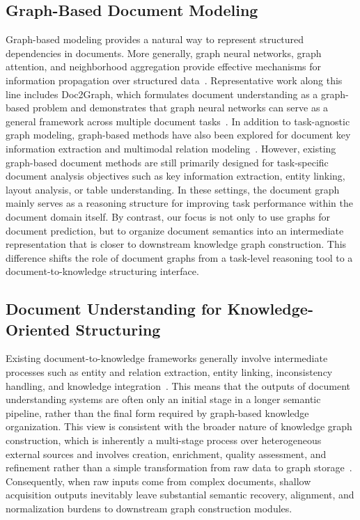 \documentclass[pdflatex,twocolumn,iicol,sn-vancouver-num]{sn-jnl}%
\theoremstyle{thmstyleone}%
\theoremstyle{thmstyletwo}%
\theoremstyle{thmstylethree}%
\begin{document}
\subsection{Graph-Based Document Modeling}
Graph-based modeling provides a natural way to represent structured dependencies in documents. More generally, graph neural networks, graph attention, and neighborhood aggregation provide effective mechanisms for information propagation over structured data~\cite{kipfSemiSupervisedClassificationGraph2017,velickovicGraphAttentionNetworks2018,hamiltonInductiveRepresentationLearning2018}.
Representative work along this line includes Doc2Graph, which formulates document understanding as a graph-based problem and demonstrates that graph neural networks can serve as a general framework across multiple document tasks~\cite{gemelliDoc2GraphTaskAgnostic2023}. In addition to task-agnostic graph modeling, graph-based methods have also been explored for document key information extraction and multimodal relation modeling~\cite{yuPICKProcessingKey2020,zhangExploringMultimodalRelation}. However, existing graph-based document methods are still primarily designed for task-specific document analysis objectives such as key information extraction, entity linking, layout analysis, or table understanding. In these settings, the document graph mainly serves as a reasoning structure for improving task performance within the document domain itself. By contrast, our focus is not only to use graphs for document prediction, but to organize document semantics into an intermediate representation that is closer to downstream knowledge graph construction. This difference shifts the role of document graphs from a task-level reasoning tool to a document-to-knowledge structuring interface.

\subsection{Document Understanding for Knowledge-Oriented Structuring}

Existing document-to-knowledge frameworks generally involve intermediate processes such as entity and relation extraction, entity linking, inconsistency handling, and knowledge integration~\cite{salmanDocKGUnstructuredDocuments2024,sunDocs2KGUnifiedKnowledge2024,galianoT2KGTransformingMultimodal2023a}. This means that the outputs of document understanding systems are often only an initial stage in a longer semantic pipeline, rather than the final form required by graph-based knowledge organization. This view is consistent with the broader nature of knowledge graph construction, which is inherently a multi-stage process over heterogeneous external sources and involves creation, enrichment, quality assessment, and refinement rather than a simple transformation from raw data to graph storage~\cite{zhongComprehensiveSurveyAutomatic2023,hoganKnowledgeGraphs2022a,paulheimAutomaticKnowledgeGraph}. Consequently, when raw inputs come from complex documents, shallow acquisition outputs inevitably leave substantial semantic recovery, alignment, and normalization burdens to downstream graph construction modules.
\end{document}
